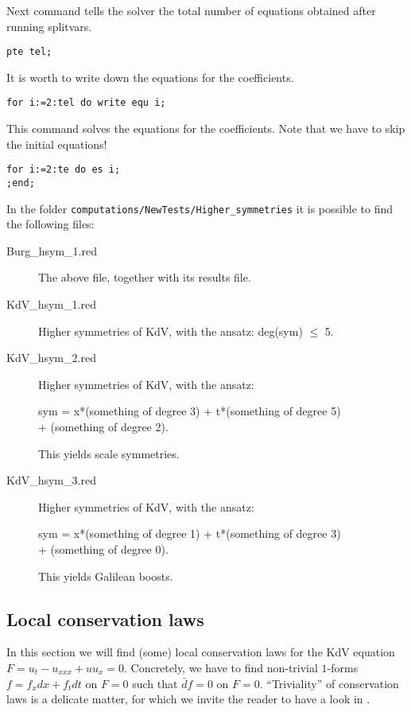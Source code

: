 \documentclass[12pt]{amsart}
\theoremstyle{definition}
\begin{document}
Next command tells the solver the total number of equations obtained
after running splitvars.
\begin{verbatim}
pte tel;
\end{verbatim}

It is worth to write down the equations for the coefficients.
\begin{verbatim}
for i:=2:tel do write equ i;
\end{verbatim}

This command solves the equations for the coefficients.
Note that we have to skip the initial equations!
\begin{verbatim}
for i:=2:te do es i;
;end;
\end{verbatim}

In the folder \texttt{computations/NewTests/Higher\_symmetries} it is possible
to find the following files:
\begin{description}
\item[Burg\_hsym\_1.red] The above file, together with its results file.
  \item[KdV\_hsym\_1.red] Higher symmetries of KdV, with the ansatz:
    deg(sym) $\leq$ 5.
\item[KdV\_hsym\_2.red] Higher symmetries of KdV, with the ansatz:
  \begin{center}
    sym = x*(something of degree 3) + t*(something of degree  5)\\
  + (something of degree 2).
  \end{center}
    This yields scale symmetries.
\item[KdV\_hsym\_3.red] Higher symmetries of KdV, with the ansatz:
  \begin{center}
    sym = x*(something of degree 1) + t*(something of degree 3)\\
    + (something of degree 0).
  \end{center}
This yields Galilean boosts.
\end{description}

\subsection{Local conservation laws}
\label{sec:local-cons-laws}

In this section we will find (some) local conservation laws for the KdV
equation $F=u_t-u_{xxx}+uu_x=0$. Concretely, we have to find non-trivial $1$-forms
$f=f_xdx+f_tdt$ on $F=0$ such that $\bar d f=0$ on $F=0$. ``Triviality'' of
conservation laws is a delicate matter, for which we invite the reader to have
a look in \cite{Many}.
\end{document}
